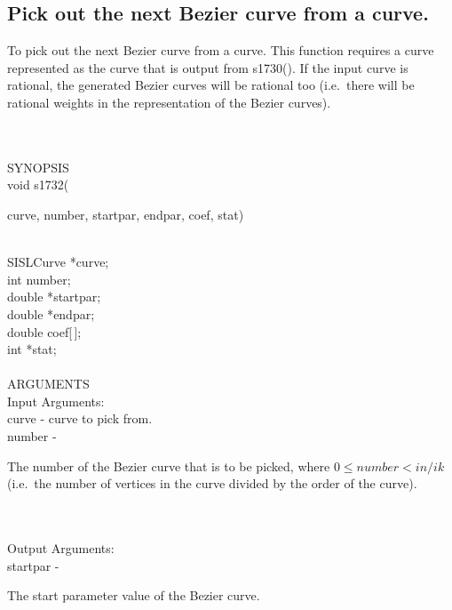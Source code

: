 \subsection{Pick out the next Bezier curve from a curve.}
\begin{minipg1}
  To pick out the next Bezier curve from a curve. This function requires a
  curve represented as the curve that is output from s1730().
  If the input curve is rational, the generated Bezier curves will be
  rational too (i.e.\ there will be rational weights in the
  representation of the Bezier curves).
\end{minipg1} \\ \\
SYNOPSIS\\
        \>void s1732(\begin{minipg3}
        {\fov curve}, {\fov number}, {\fov startpar}, {\fov endpar}, {\fov coef}, {\fov stat})
                \end{minipg3}\\[0.3ex]
                \>\>    SISLCurve       \>      *{\fov curve};\\
                \>\>    int     \>      {\fov number};\\
                \>\>    double  \>      *{\fov startpar};\\
                \>\>    double  \>      *{\fov endpar};\\
                \>\>    double  \>      {\fov coef}[\,];\\
                \>\>    int     \>      *{\fov stat};\\
\\
ARGUMENTS\\
        \>Input Arguments:\\
        \>\>    {\fov curve}    \> - \> curve to pick from.\\
        \>\>    {\fov number}   \> - \>\begin{minipg2}
                                The number of the Bezier curve that is
                                to be picked, where $0\leq number<in/ik$
                                (i.e.\ the number of vertices in the
                                curve divided by the order of the curve).
                                \end{minipg2}\\[0.8ex]
\\
        \>Output Arguments:\\
        \>\>    {\fov startpar}\> - \>\begin{minipg2}
                                The start parameter value of the Bezier curve.
                                \end{minipg2}\\
